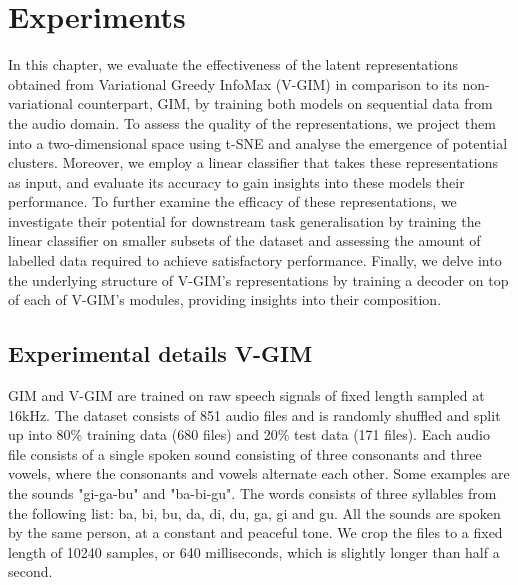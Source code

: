 \chapter{Experiments}

In this chapter, we evaluate the effectiveness of the latent representations obtained from Variational Greedy InfoMax (V-GIM) in comparison to its non-variational counterpart, GIM, by training both models on sequential data from the audio domain. To assess the quality of the representations, we project them into a two-dimensional space using t-SNE and analyse the emergence of potential clusters. Moreover, we employ a linear classifier that takes these representations as input, and evaluate its accuracy to gain insights into these models their performance. To further examine the efficacy of these representations, we investigate their potential for downstream task generalisation by training the linear classifier on smaller subsets of the dataset and assessing the amount of labelled data required to achieve satisfactory performance. Finally, we delve into the underlying structure of V-GIM's representations by training a decoder on top of each of V-GIM's modules, providing insights into their composition.


%	

	







\section{Experimental details V-GIM}
		GIM and V-GIM are trained on raw speech signals of fixed length sampled at 16kHz. The dataset consists of 851  audio files and is randomly shuffled and split up into 80\% training data (680 files) and 20\% test data (171 files). Each audio file consists of a single spoken sound consisting of three consonants and three vowels, where the consonants and vowels alternate each other. Some examples are the sounds "gi-ga-bu" and "ba-bi-gu".	The words consists of three syllables from the following list: ba, bi, bu, da, di, du, ga, gi and gu. All the sounds are spoken by the same person, at a constant and peaceful tone. We crop the files to a fixed length of 10240 samples, or 640 milliseconds, which is slightly longer than half a second.
		
